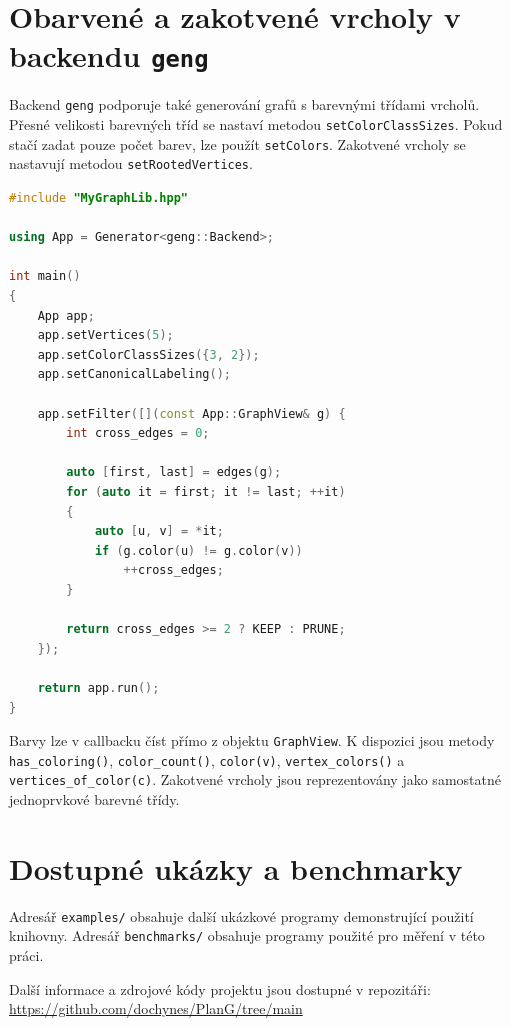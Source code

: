 \section{Obarvené a zakotvené vrcholy v backendu \texttt{geng}}

Backend \texttt{geng} podporuje také generování grafů s barevnými třídami
vrcholů. Přesné velikosti barevných tříd se nastaví metodou
\texttt{setColorClassSizes}. Pokud stačí zadat pouze počet barev, lze použít
\texttt{setColors}. Zakotvené vrcholy se nastavují metodou
\texttt{setRootedVertices}.

\begin{listing}
\begin{lstlisting}[language=C++]
#include "MyGraphLib.hpp"

using App = Generator<geng::Backend>;

int main()
{
    App app;
    app.setVertices(5);
    app.setColorClassSizes({3, 2});
    app.setCanonicalLabeling();

    app.setFilter([](const App::GraphView& g) {
        int cross_edges = 0;

        auto [first, last] = edges(g);
        for (auto it = first; it != last; ++it)
        {
            auto [u, v] = *it;
            if (g.color(u) != g.color(v))
                ++cross_edges;
        }

        return cross_edges >= 2 ? KEEP : PRUNE;
    });

    return app.run();
}
\end{lstlisting}
\caption{Generování grafů s dvěma barevnými třídami.}
\label{lst:howto-colored}
\end{listing}

Barvy lze v callbacku číst přímo z objektu \texttt{GraphView}. K dispozici jsou
metody \texttt{has\_coloring()}, \texttt{color\_count()},
\texttt{color(v)}, \texttt{vertex\_colors()} a
\texttt{vertices\_of\_color(c)}. Zakotvené vrcholy jsou reprezentovány jako
samostatné jednoprvkové barevné třídy.

\section{Dostupné ukázky a benchmarky}

Adresář \texttt{examples/} obsahuje další ukázkové programy demonstrující použití knihovny.
Adresář \texttt{benchmarks/} obsahuje programy použité pro měření v této práci.



Další informace a zdrojové kódy projektu jsou dostupné v repozitáři:
\url{https://github.com/dochynes/PlanG/tree/main}

